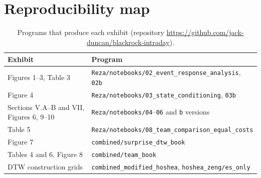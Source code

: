 \documentclass[12pt]{article}
\begin{document}
\section{Reproducibility map}
\begin{table}[htbp]
  \centering\small
  \caption{Programs that produce each exhibit (repository \url{https://github.com/jack-duncan/blackrock-intraday}).}
  \begin{tabular}{ll}
    \toprule
    Exhibit & Program \\
    \midrule
    Figures 1--3, Table 3 & \texttt{Reza/notebooks/02\_event\_response\_analysis}, \texttt{02b} \\
    Figure 4 & \texttt{Reza/notebooks/03\_state\_conditioning}, \texttt{03b} \\
    Sections V.A--B and VII, Figures 6, 9--10 & \texttt{Reza/notebooks/04}--\texttt{06} and \texttt{b} versions \\
    Table 5 & \texttt{Reza/notebooks/08\_team\_comparison\_equal\_costs} \\
    Figure 7 & \texttt{combined/surprise\_dtw\_book} \\
    Tables 4 and 6, Figure 8 & \texttt{combined/team\_book} \\
    DTW construction grids & \texttt{combined\_modified\_hoshea}, \texttt{hoshea\_zeng/es\_only} \\
    \bottomrule
  \end{tabular}
\end{table}
\end{document}
